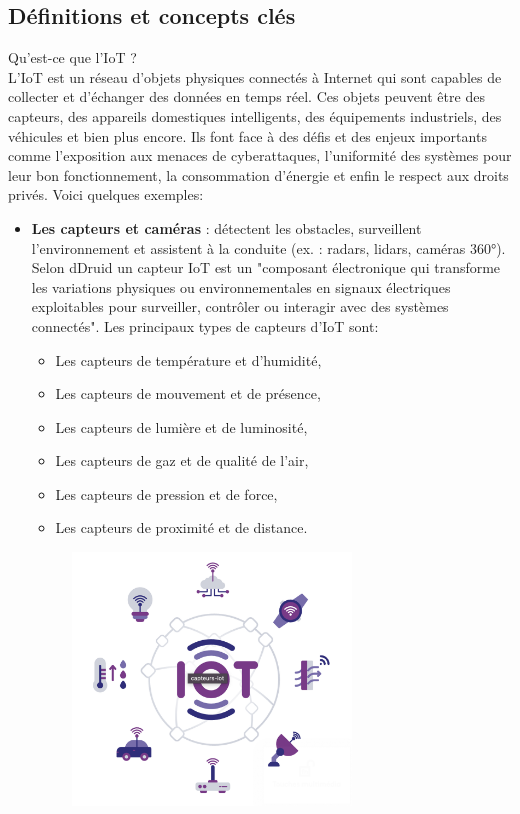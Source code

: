 \subsection{Définitions et concepts clés}
Qu'est-ce que l'IoT ?\\
L'IoT est un réseau d’objets physiques connectés à Internet qui sont capables de collecter et d’échanger des données en temps réel. Ces objets peuvent être des capteurs, des appareils domestiques intelligents, des équipements industriels, des véhicules et bien plus encore. Ils font face à des défis et des enjeux importants comme l'exposition aux menaces de cyberattaques, l'uniformité des systèmes pour leur bon fonctionnement, la consommation d'énergie et enfin le respect aux droits privés. Voici quelques exemples:
\begin{itemize}
    \item \textbf{Les capteurs et caméras} : détectent les obstacles, surveillent l’environnement et assistent à la conduite (ex. : radars, lidars, caméras 360°). Selon dDruid\cite{capteur} un capteur IoT est un "composant électronique qui transforme les variations physiques ou environnementales en signaux électriques exploitables pour surveiller, contrôler ou interagir avec des systèmes connectés".
    Les principaux types de capteurs d'IoT sont: 
    \begin{itemize}
        \label{capteurs}
        \item Les capteurs de température et d'humidité,
        \item Les capteurs de mouvement et de présence,
        \item Les capteurs de lumière et de luminosité,
        \item Les capteurs de gaz et de qualité de l’air,
        \item Les capteurs de pression et de force,
        \item Les capteurs de proximité et de distance.
    \end{itemize}
    \begin{figure}[H]
        \centering
        \includegraphics[width=0.7\textwidth]{images/capteur.png} 

\end{figure}
\end{itemize}
